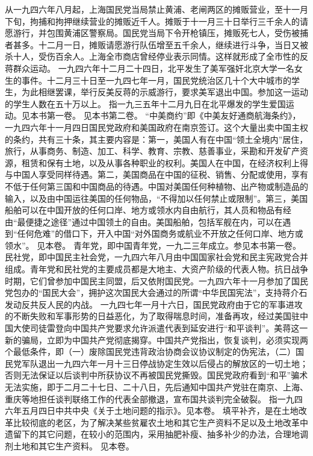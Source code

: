 \begin{maonote}
从一九四六年八月起，上海国民党当局禁止黄浦、老闸两区的摊贩营业，至十一月下旬，拘捕和拘押继续营业的摊贩近千人。摊贩于十一月三十日举行三千余人的请愿游行，并包围黄浦区警察局。国民党当局下令开枪镇压，摊贩死七人，受伤被捕者甚多。十二月一日，摊贩请愿游行队伍增至五千余人，继续进行斗争，当日又被杀十人，受伤百余人。上海全市商店曾经停业表示同情。这样就形成了全市性的反蒋群众运动。
一九四六年十二月二十四日，北平发生了美军强奸北京大学一名女生的事件。十二月三十日至一九四七年一月，国民党统治区几十个大中城市的学生，为此相继罢课，举行反美反蒋的示威游行，要求美军退出中国。参加这一运动的学生人数在五十万以上。
指一九三五年十二月九日在北平爆发的学生爱国运动。见本书第一卷。
见本书第二卷。
“中美商约”即《中美友好通商航海条约》，一九四六年十一月四日国民党政府和美国政府在南京签订。这个大量出卖中国主权的条约，共有三十条，其主要内容是：第一，美国人有在中国“领土全境内”居住，旅行，从事商务、制造、加工、科学、教育、宗教、慈善事业，采勘和开发矿产资源，租赁和保有土地，以及从事各种职业的权利。美国人在中国，在经济权利上得与中国人享受同样待遇。第二，美国商品在中国的征税、销售、分配或使用，享有不低于任何第三国和中国商品的待遇。中国对美国任何种植物、出产物或制造品的输入，以及由中国运往美国的任何物品，“不得加以任何禁止或限制”。第三，美国船舶可以在中国开放的任何口岸、地方或领水内自由航行，其人员和物品有经由“最便捷之途径”通过中国领土的自由。美国船舶，包括军舰在内，可以在遇到“任何危难”的借口下，开入中国“对外国商务或航业不开放之任何口岸、地方或领水”。
见本卷。
青年党，即中国青年党，一九二三年成立。参见本书第一卷。民社党，即中国民主社会党，一九四六年八月由中国国家社会党和民主宪政党合并组成。青年党和民社党的主要成员都是大地主、大资产阶级的代表人物。抗日战争时期，它们曾参加中国民主同盟，后又依附国民党。一九四六年十一月参加了国民党包办的“国民大会”，拥护这次国民大会通过的所谓“中华民国宪法”，支持蒋介石发动反共反人民的内战。
一九四七年一月十六日，国民党政府由于它的军事进攻的不断失败和军事形势的日益恶化，为了取得喘息时间，准备再攻，经过美国驻中国大使司徒雷登向中国共产党要求允许派遣代表到延安进行“和平谈判”。美蒋这一新的骗局，立即为中国共产党彻底揭穿。中国共产党指出，恢复谈判，必须实现两个最低条件，即（一）废除国民党违背政治协商会议协议制定的伪宪法，（二）国民党军队退出一九四六年一月十三日停战协定生效以后侵占的解放区的一切土地；否则无法保证以后谈判中所获协议不再被国民党撕毁。国民党政府看到“和平”骗术无法实施，即于二月二十七日、二十八日，先后通知中国共产党驻在南京、上海、重庆等地担任谈判联络工作的代表全部撤退，宣布国共谈判完全破裂。
指一九四六年五月四日中共中央《关于土地问题的指示》。见本卷。
填平补齐，是在土地改革比较彻底的老区，为了解决某些贫雇农土地和其它生产资料不足以及土地改革中遗留下的其它问题，在较小的范围内，采用抽肥补瘦、抽多补少的办法，合理地调剂土地和其它生产资料。
见本卷。
\end{maonote}
